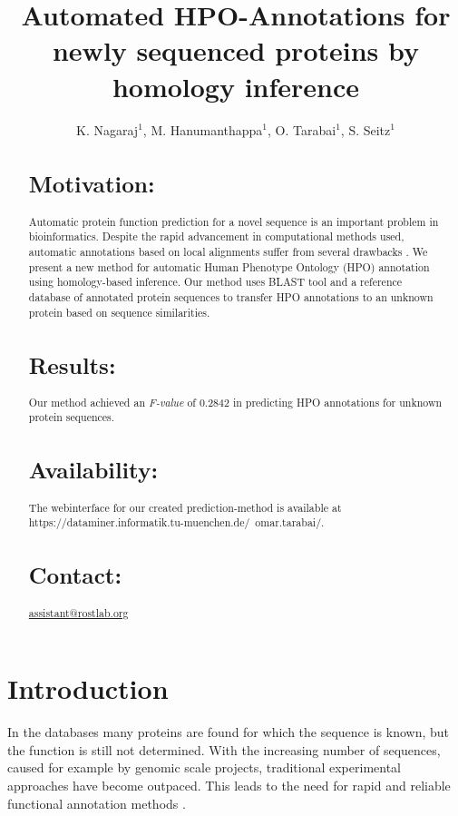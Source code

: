 \documentclass{bioinfo}
\begin{document}

\title{Automated HPO-Annotations for newly sequenced proteins by homology inference}
\author{K. Nagaraj$^{1}$, M. Hanumanthappa$^{1}$, O. Tarabai$^{1}$, S. Seitz$^{1}$}
\address{$^{1}$Fakul\"at f\"ur Informatik, Boltzmannstr. 3, 85748 Garching}



\maketitle

\begin{abstract}

\section{Motivation:}
Automatic protein function prediction for a novel sequence is an important problem in bioinformatics. Despite the rapid advancement in computational methods used, automatic annotations based on local alignments suffer from several drawbacks \citep{Ori06}. We present a new method for automatic Human Phenotype Ontology (HPO) annotation using homology-based inference. Our method uses BLAST tool and a reference database of annotated protein sequences to transfer HPO annotations to an unknown protein based on sequence similarities.
\section{Results:}
Our method achieved an \textit{F-value} of 0.2842 in predicting HPO annotations for unknown protein sequences.
\section{Availability:}
The webinterface for our created prediction-method is available at https://dataminer.informatik.tu-muenchen.de/~omar.tarabai/.

\section{Contact:} \href{assistant@rostlab.org}{assistant@rostlab.org}
\end{abstract}

\section{Introduction}
In the databases many proteins are found for which the sequence is known, but the function is still not determined. With the increasing number of sequences, caused for example by genomic scale projects, traditional experimental approaches have become outpaced. This leads to the need for rapid and reliable functional annotation methods \citep{Rodrigues07}. 
\end{document}
